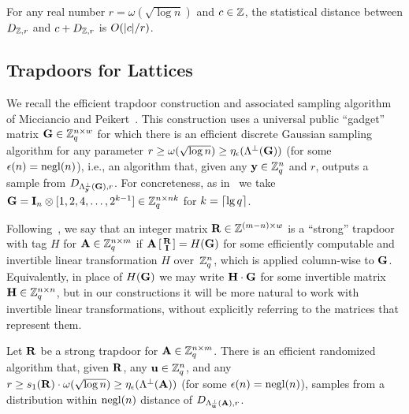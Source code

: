 \begin{lemma}%
  \label{sumplusgaussian}
  For any real number $r = \omega(\sqrt{\log{n}})$ and $c \in \mathbb{Z}$, the
  statistical distance between $D_{\mathbb{Z}, r}$ and $c+D_{\mathbb{Z}, r}$ is
  $O(\lvert{c}\rvert/r)$.
\end{lemma}

\subsection{Trapdoors for Lattices}
\label{subsec:trapdoors}

We recall the efficient trapdoor construction and associated sampling
algorithm of Micciancio and
Peikert~\cite{DBLP:conf/eurocrypt/MicciancioP12}. This construction uses
a universal public ``gadget'' matrix $\mathbf{G} \in \mathbb{Z}_q^{n \times w}$ for
which there is an efficient discrete Gaussian sampling algorithm for
any parameter $r \geq \omega(\sqrt{\log{n}}) \geq
\eta_{\epsilon}(\Lambda^{\perp}(\mathbf{G}))$ (for some $\epsilon(n)=\operatorname{negl}(n)$), i.e.,
an algorithm that, given any $\mathbf{y} \in \mathbb{Z}_q^{n}$ and $r$, outputs a
sample from $D_{\Lambda^{\perp}_{\mathbf{y}}(\mathbf{G}),r}$.  For concreteness, as
in~\cite{DBLP:conf/eurocrypt/MicciancioP12} we take $\mathbf{G} = \mathbf{I}_{n}
\otimes [1, 2, 4, \ldots, 2^{k-1}] \in \mathbb{Z}_q^{n \times nk}$ for $k =
\lceil{\lg q}\rceil$.

Following~\cite{DBLP:conf/eurocrypt/MicciancioP12}, we say that an
integer matrix $\mathbf{R} \in \mathbb{Z}^{(m-n) \times w}$ is a ``strong''
trapdoor with tag $H$ for $\mathbf{A} \in \mathbb{Z}_q^{n \times m}$ if $\mathbf{A}
\left[ \begin{smallmatrix} \mathbf{R} \\ \mathbf{I}
  \end{smallmatrix} \right] = H(\mathbf{G})$ for some efficiently
computable and invertible linear transformation $H$ over~$\mathbb{Z}_q^{n}$,
which is applied column-wise to $\mathbf{G}$.  Equivalently, in place of
$H(\mathbf{G})$ we may write $\mathbf{H} \cdot \mathbf{G}$ for some invertible matrix
$\mathbf{H} \in \mathbb{Z}_q^{n \times n}$, but in our constructions it will be more
natural to work with invertible linear transformations, without
explicitly referring to the matrices that represent them.

\begin{lemma}
  \label{lem:trapgen-sample}
  Let $\mathbf{R}$ be a strong trapdoor for $\mathbf{A} \in \mathbb{Z}_q^{n \times m}$.
  There is an efficient randomized algorithm that, given $\mathbf{R}$, any
  $\mathbf{u} \in \mathbb{Z}_q^n$, and any $r \geq s_1(\mathbf{R})\cdot
  \omega(\sqrt{\log{n}}) \geq \eta_{\epsilon}(\Lambda^{\perp}(\mathbf{A}))$ (for
  some $\epsilon(n) = \operatorname{negl}(n)$), samples from a distribution within
  $\operatorname{negl}(n)$ distance of $D_{\Lambda_{\mathbf{u}}^{\perp}(\mathbf{A}), r}$.
\end{lemma}

